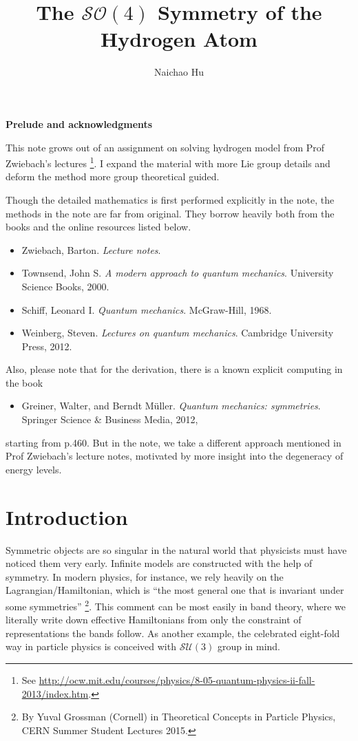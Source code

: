 \documentclass[a4paper,11pt]{article}
\title{\boldmath The $\mathcal{SO}(4)$ Symmetry of the Hydrogen Atom}
\author{Naichao Hu}
\affiliation{Department of Physics,\\Sun Yat-sen University}
\renewcommand{\acknowledgments}{\textbf{Prelude and acknowledgments}}
\theoremstyle{remark}
\theoremstyle{defn}
\begin{document}
 
\maketitle
\flushbottom


\clearpage

\acknowledgments
\par
This note grows out of an assignment on solving hydrogen model from Prof Zwiebach's lectures
\footnote{See \url{http://ocw.mit.edu/courses/physics/8-05-quantum-physics-ii-fall-2013/index.htm}.}. I expand the material with more Lie group details and deform the method more
group theoretical guided.\par 
Though the detailed mathematics is first performed explicitly in the note, 
the methods in the note are far from original. They borrow heavily both from the books 
and the online resources listed below. 
\begin{itemize}
\item Zwiebach, Barton. \textit{Lecture notes}.
\item Townsend, John S. \textit{A modern approach to quantum mechanics}. University Science Books, 2000.
\item Schiff, Leonard I. \textit{Quantum mechanics}. McGraw-Hill, 1968.
\item Weinberg, Steven. \textit{Lectures on quantum mechanics}. Cambridge University Press, 2012.
\end{itemize}
\par Also, please note that for the derivation, there is a known explicit computing in
the book
\begin{itemize}
\item Greiner, Walter, and Berndt M\"uller. \textit{Quantum mechanics: symmetries}. Springer Science \& Business Media, 2012,
\end{itemize}
starting from p.460. But in the note, we take a different approach mentioned in Prof Zwiebach's lecture notes, motivated by more insight into the degeneracy of energy levels.
\clearpage

\section{Introduction}
\label{s:math}
Symmetric objects are so singular in the natural world that physicists must have
noticed them very early. Infinite models are constructed with the help of symmetry. 
In modern physics, for instance, we rely heavily on the Lagrangian/Hamiltonian, which is 
``the most general one that is invariant under some symmetries''
\footnote{By Yuval Grossman (Cornell) in Theoretical Concepts in Particle Physics, CERN Summer Student Lectures 2015.}.
This comment can be most easily in band theory, where we literally write down effective Hamiltonians 
from only the constraint of representations the bands follow. As another example, the celebrated
eight-fold way in particle physics is conceived with $\mathcal{SU}(3)$ group in mind.\par 
\end{document}
